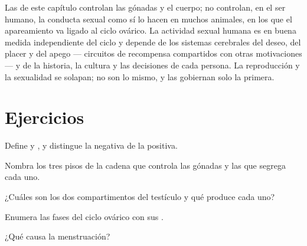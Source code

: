 \begin{remark}\label{rem:g11:hormones-and-reproduction:brain}
Las  de este capítulo controlan las gónadas y el cuerpo; no
controlan, en el ser humano, la conducta sexual como sí lo hacen en
muchos animales, en los que el apareamiento va ligado al ciclo ovárico.
La actividad sexual humana es en buena medida independiente del ciclo y
depende de los sistemas cerebrales del deseo, del placer y del apego
--- circuitos de recompensa compartidos con otras motivaciones --- y de
la historia, la cultura y las decisiones de cada persona. La
reproducción y la sexualidad se solapan; no son lo mismo, y las
 gobiernan solo la primera.
\end{remark}

\section{Ejercicios}

\begin{exercise}[$\star$]\label{exo:g11:hormones-and-reproduction:1}
Define  y , y distingue la 
negativa de la positiva.
\end{exercise}

\begin{exercise}[$\star$]\label{exo:g11:hormones-and-reproduction:2}
Nombra los tres pisos de la cadena que controla las gónadas y las
 que segrega cada uno.
\end{exercise}

\begin{exercise}[$\star$]\label{exo:g11:hormones-and-reproduction:3}
¿Cuáles son los dos compartimentos del testículo y qué produce cada
uno?
\end{exercise}

\begin{exercise}[$\star$]\label{exo:g11:hormones-and-reproduction:4}
Enumera las fases del ciclo ovárico con sus .
\end{exercise}

\begin{exercise}[$\star$]\label{exo:g11:hormones-and-reproduction:5}
¿Qué causa la menstruación?
\end{exercise}

